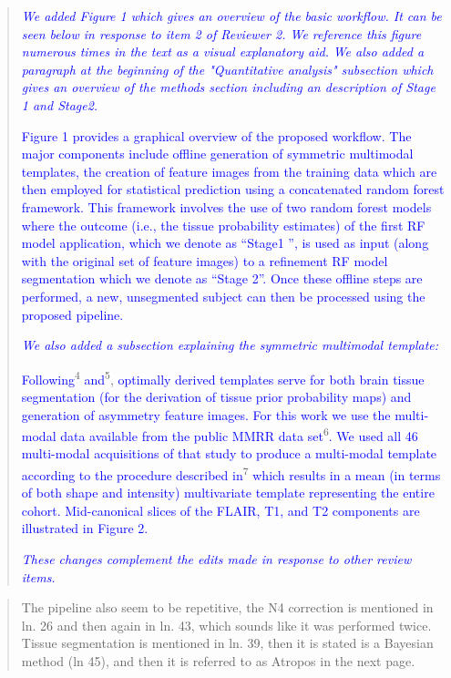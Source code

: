 \documentclass[12pt,]{article}
\begin{document}
\begin{quote}
\emph{\textcolor{blue}{We added Figure 1 which gives an overview of the basic workflow.
  It can be seen below in response to item 2 of Reviewer 2.  We reference
  this figure numerous times in the text as a visual explanatory aid.}}
\emph{\textcolor{blue}{We also added a paragraph at the beginning of the "Quantitative analysis" subsection
  which gives an overview of the methods section including an description of Stage 1 and Stage2.}}

\textcolor{blue}{Figure 1 provides a graphical overview of the proposed workflow.  The major components
include offline generation of symmetric multimodal templates, the creation of
feature images from the training data which are then employed for statistical
prediction using a concatenated random forest framework.  This framework involves
the use of two random forest models where the outcome (i.e., the tissue
probability estimates) of the first RF model application,
which we denote as ``Stage1 '', is used as input (along with the original set of
feature images) to a refinement RF model segmentation which we denote as ``Stage 2''.
Once these offline steps
are performed, a new, unsegmented subject can then be processed using the proposed pipeline.}

\emph{\textcolor{blue}{We also added a subsection explaining the symmetric multimodal template:}}

\textcolor{blue}{Following}\textsuperscript{4}
\textcolor{blue}{and}\textsuperscript{5},
\textcolor{blue}{optimally derived templates
serve for both brain tissue segmentation (for the derivation of tissue prior probability maps) and generation of asymmetry feature images.
For this work we use the multi-modal data available from the public MMRR data set}\textsuperscript{6}\textcolor{blue}{.  We used all 46 multi-modal acquisitions of that study to produce a multi-modal template according to the procedure described in}\textsuperscript{7}
\textcolor{blue}{which
results in a mean (in terms of both shape and intensity) multivariate template representing the entire cohort.  Mid-canonical slices of the FLAIR, T1, and T2 components are illustrated in Figure 2.}

\emph{\textcolor{blue}{These changes complement the edits made in response to other review items.}}
\end{quote}

\begin{quote}
The pipeline also seem to be repetitive, the N4 correction is mentioned
in ln. 26 and then again in ln. 43, which sounds like it was performed
twice. Tissue segmentation is mentioned in ln. 39, then it is stated is
a Bayesian method (ln 45), and then it is referred to as Atropos in the
next page.
\end{quote}
\end{document}
